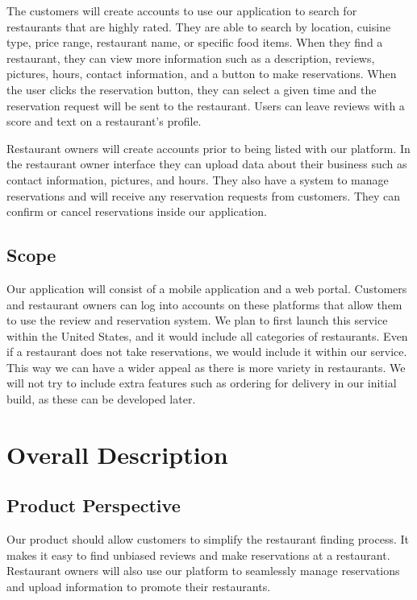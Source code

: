 \documentclass[12pt]{article}
\begin{document}
The customers will create accounts to use our application to search for restaurants that are highly rated. They are
able to search by location, cuisine type, price range, restaurant name, or specific food items. When they find a restaurant, they can
view more information such as a description, reviews, pictures, hours, contact information, and a button to make reservations.
When the user clicks the reservation button, they can select a given time and the reservation request will be sent to the restaurant.
Users can leave reviews with a score and text on a restaurant's profile.

Restaurant owners will create accounts prior to being listed with our platform. In the restaurant owner interface they can upload
data about their business such as contact information, pictures, and hours. They also have a system to manage reservations and
will receive any reservation requests from customers. They can confirm or cancel reservations inside our application.

\subsection{Scope}

Our application will consist of a mobile application and a web portal. Customers and restaurant owners can log into accounts
on these platforms that allow them to use the review and reservation system. We plan to first launch this service within the United States,
and it would include all categories of restaurants. Even if a restaurant does not take reservations, we would include it within our service.
This way we can have a wider appeal as there is more variety in restaurants. We will not try to include extra features such as ordering
for delivery in our initial build, as these can be developed later.

\section{Overall Description}

\subsection{Product Perspective}

Our product should allow customers to simplify the restaurant finding process. It makes it easy to find unbiased reviews and make
reservations at a restaurant. Restaurant owners will also use our platform to seamlessly manage reservations and upload information
to promote their restaurants.
\end{document}

